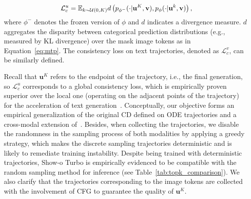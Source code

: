 \begin{equation}\small
\label{lc}
\mathcal{L}^u_{c} = \mathbb{E}_{k \sim \mathcal{U}(0,K)}  d\left(p_{\phi^-}(\cdot|\mathbf{u}^K, \mathbf{v}), p_\phi(\cdot|\mathbf{u}^k, \mathbf{v})\right) ,
\end{equation}
where ${\phi^-}$ denotes the frozen version of ${\phi}$ and $d$ indicates a divergence measure. 
$d$ aggregates the disparity between categorical prediction distributions (e.g., measured by KL divergence) over the mask image tokens as in Equation~\ref{eq:mtp}. %
The consistency loss on text trajectories, denoted as $\mathcal{L}^v_{c}$, can be similarly defined.


Recall that $\mathbf{u}^K$ refers to the endpoint of the trajectory, i.e., the final generation, so $\mathcal{L}^u_{c}$ corresponds to a global consistency loss, which is empirically proven superior over the local one (operating on the adjacent points of the trajectory) for the acceleration of text generation~\cite{kou2024cllms}. 
Conceptually, our objective forms an empirical generalization of the original CD defined on ODE trajectories and a cross-modal extension of~\cite{kou2024cllms}. 
Besides, when collecting the trajectories, we disable the randomness in the sampling process of both modalities by applying a greedy strategy, which makes the discrete sampling trajectories deterministic and is likely to remediate training instability. 
Despite being trained with deterministic trajectories, Show-o Turbo is empirically evidenced to be compatible with the random sampling method for inference (see Table~\ref{tab:topk_comparison}). 
We also clarify that the trajectories corresponding to the image tokens are collected with the involvement of CFG to guarantee the quality of $\mathbf{u}^K$. 

